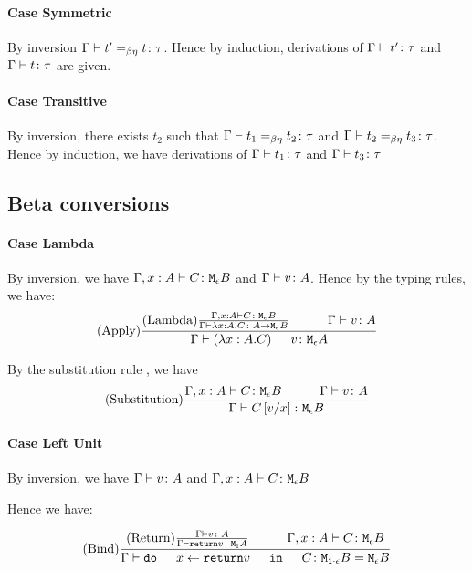 {    \paragraph{Case Symmetric}
    By inversion $\Gamma \vdash t' =_{\beta\eta} t \colon \tau$. Hence by induction, derivations of $\Gamma \vdash t' \colon \tau$ and $\Gamma \vdash t \colon \tau$ are given.

    \paragraph{Case Transitive}
    By inversion, there exists $t_2$ such that $\Gamma \vdash t_1 =_{\beta\eta} t_2 \colon \tau$ and $\Gamma \vdash t_2 =_{\beta\eta} t_3 \colon \tau$. Hence by induction, we have derivations of $\Gamma \vdash t_1 \colon \tau$ and $\Gamma \vdash t_3 \colon \tau$

    \subsection{Beta conversions}
    
    \paragraph{Case Lambda}
        By inversion, we have $\Gamma, x: A \vdash C \colon \texttt{M}_{\epsilon}{B}$ and $\Gamma \vdash v \colon A$. Hence by the typing rules, we have:
        $$\treerule{Apply}{
            \treerule{Lambda}{\typerelation{\gax }{C}{\meb}}{\gtyperelation{\lam{x}{A}{C}}{\aeb}}
            \s\s
            \gtyperelation{v}{A}
        }{\gtyperelation{\apply{(\lam{x}{A}{C})}{v}}{\mea}}$$

        By the substitution rule , we have 
        $$\treerule{Substitution}{\typerelation{\gax}{C}{\meb}\s\s\gtyperelation{v}{A}}{\gtyperelation{C\ssub{x}{v}}{\meb}}$$
        \paragraph{Case Left Unit}
        By inversion, we have $\Gamma \vdash v \colon A$ and $\Gamma, x: A  \vdash C \colon \texttt{M}_{\epsilon}{B}$

        Hence we have:


        \begin{equation}
            \treerule{Bind}{\treerule{Return}{\gtyperelation{v}{A}}{\gtyperelation{\return{v}}{\moa}}\s\s\typerelation{\gax}{C}{\meb}}{\gtyperelation{\doin{x}{\return{v}}{C}}{\M{\1\dot\e}{B} = \meb}}
        \end{equation}

}
